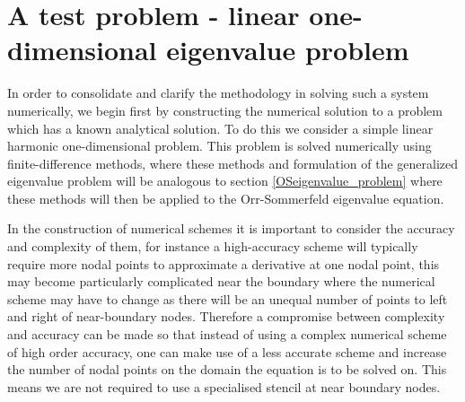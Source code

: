 \documentclass[a4paper, 12pt, twoside, openright]{article}
\numberwithin{equation}{section}
\begin{document}
%
%
%
%
\newpage
\section{A test problem - linear one-dimensional eigenvalue problem} \label{oneDeigenvalue_problem}
% 
%
In order to consolidate and clarify the methodology in solving such a system numerically, we begin first by constructing the numerical solution to a problem which has a known analytical solution. To do this we consider a simple linear harmonic one-dimensional problem. This problem is solved numerically using finite-difference methods, where these methods and formulation of the generalized eigenvalue problem will be analogous to section \ref{OSeigenvalue_problem} where these methods will then be applied to the Orr-Sommerfeld eigenvalue equation. %

In the construction of numerical schemes it is important to consider the accuracy and complexity of them, for instance a high-accuracy scheme will typically require more nodal points to approximate a derivative at one nodal point, this may become particularly complicated near the boundary where the numerical scheme may have to change as there will be an unequal number of points to left and right of near-boundary nodes. Therefore a compromise between complexity and accuracy can be made so that instead of using a complex numerical scheme of high order accuracy, one can make use of a less accurate scheme and increase the number of nodal points on the domain the equation is to be solved on. This means we are not required to use a specialised stencil at near boundary nodes. %
  
\end{document}
